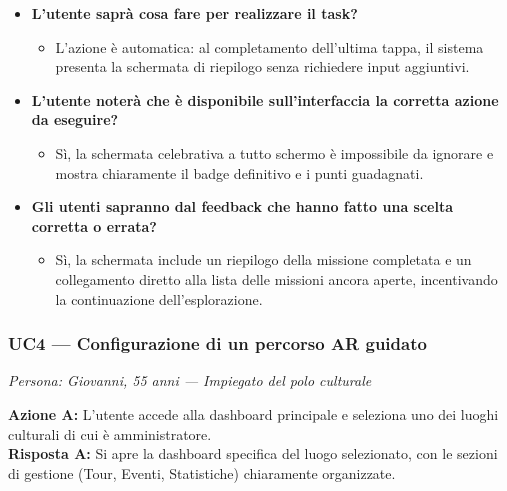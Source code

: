 \begin{itemize}[nosep, leftmargin=1.6em]
    \item \textbf{L'utente saprà cosa fare per realizzare il task?}
    \begin{itemize}[nosep, leftmargin=1.6em]
        \item L'azione è automatica: al completamento dell'ultima tappa, il sistema presenta la schermata di riepilogo senza richiedere input aggiuntivi.
    \end{itemize}
    \item \textbf{L'utente noterà che è disponibile sull'interfaccia la corretta azione da eseguire?}
    \begin{itemize}[nosep, leftmargin=1.6em]
        \item Sì, la schermata celebrativa a tutto schermo è impossibile da ignorare e mostra chiaramente il badge definitivo e i punti guadagnati.
    \end{itemize}
    \item \textbf{Gli utenti sapranno dal feedback che hanno fatto una scelta corretta o errata?}
    \begin{itemize}[nosep, leftmargin=1.6em]
        \item Sì, la schermata include un riepilogo della missione completata e un collegamento diretto alla lista delle missioni ancora aperte, incentivando la continuazione dell'esplorazione.
    \end{itemize}
\end{itemize}

\vspace{0.5cm}
\subsubsection{UC4 --- Configurazione di un percorso AR guidato}
\textit{Persona: Giovanni, 55 anni --- Impiegato del polo culturale}

\vspace{0.3cm}

\noindent\textbf{Azione A:} L'utente accede alla dashboard principale e seleziona uno dei luoghi culturali di cui è amministratore.\\
\textbf{Risposta A:} Si apre la dashboard specifica del luogo selezionato, con le sezioni di gestione (Tour, Eventi, Statistiche) chiaramente organizzate.

